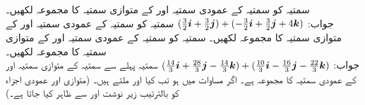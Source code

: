 سمتیہ  کو سمتیہ  کے عمودی سمتیہ اور  کے متوازی سمتیہ کا مجموعہ لکھیں۔\\
جواب:\quad
$(\tfrac{3}{2}{\boldsymbol{i}}+\tfrac{3}{2}{\boldsymbol{j}})+(-\tfrac{3}{2}{\boldsymbol{i}}+\tfrac{3}{2}{\boldsymbol{j}}+4{\boldsymbol{k}})$
سمتیہ  کو سمتیہ  کے عمودی سمتیہ اور  کے متوازی سمتیہ کا مجموعہ لکھیں۔
سمتیہ  کو سمتیہ  کے عمودی سمتیہ اور  کے متوازی سمتیہ کا مجموعہ لکھیں۔\\
جواب:\quad
$(\tfrac{14}{3}{\boldsymbol{i}}+\tfrac{28}{3}{\boldsymbol{j}}-\tfrac{14}{3}{\boldsymbol{k}})+(\tfrac{10}{3}{\boldsymbol{i}}-\tfrac{16}{3}{\boldsymbol{j}}-\tfrac{22}{3}{\boldsymbol{k}})$
سمتیہ  پہلے سے سمتیہ  کے متوازی سمتیہ اور  کے عمودی سمتیہ کا مجموعہ ہے۔  اگر مساوات  میں  ہو تب کیا  اور  ملتے ہیں۔ (متوازی اور عمودی اجزاء کو بالترتیب زیر نوشت  اور  سے ظاہر کیا جاتا ہے۔)

